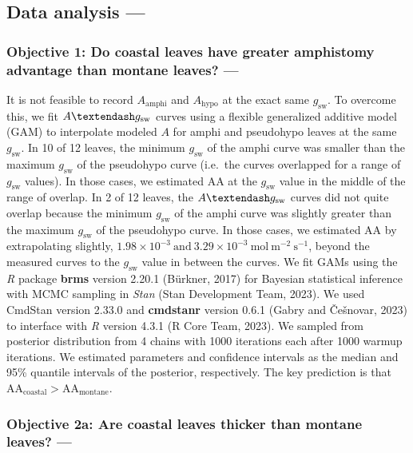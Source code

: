 \documentclass[
  letterpaper,
  DIV=11,
  numbers=noendperiod]{scrartcl}
\begin{document}
\hypertarget{data-analyis}{%
\subsection{Data analysis ---}\label{data-analyis}}

\hypertarget{objective-1-do-coastal-leaves-have-greater-amphistomy-advantage-than-montane-leaves}{%
\subsubsection{Objective 1: Do coastal leaves have greater amphistomy
advantage than montane leaves?
---}\label{objective-1-do-coastal-leaves-have-greater-amphistomy-advantage-than-montane-leaves}}

It is not feasible to record \(A_\mathrm{amphi}\) and
\(A_\mathrm{hypo}\) at the exact same \(g_\text{sw}\). To overcome this,
we fit \(A \textendash g_\text{sw}\) curves using a flexible generalized
additive model (GAM) to interpolate modeled \(A\) for amphi and
pseudohypo leaves at the same \(g_\text{sw}\). In 10 of 12 leaves, the
minimum \(g_\text{sw}\) of the amphi curve was smaller than the maximum
\(g_\text{sw}\) of the pseudohypo curve (i.e.~the curves overlapped for
a range of \(g_\text{sw}\) values). In those cases, we estimated
\(\mathrm{AA}\) at the \(g_\mathrm{sw}\) value in the middle of the
range of overlap. In 2 of 12 leaves, the \(A \textendash g_\text{sw}\)
curves did not quite overlap because the minimum \(g_\text{sw}\) of the
amphi curve was slightly greater than the maximum \(g_\text{sw}\) of the
pseudohypo curve. In those cases, we estimated \(\mathrm{AA}\) by
extrapolating slightly,
\(1.98\times 10^{-3}~\text{and}~3.29\times 10^{-3}~\text{mol}~\text{m}^{-2}~\text{s}^{-1}\),
beyond the measured curves to the \(g_\mathrm{sw}\) value in between the
curves. We fit GAMs using the \emph{R} package \textbf{brms} version
2.20.1 (Bürkner, 2017) for Bayesian statistical inference with MCMC
sampling in \emph{Stan} (Stan Development Team, 2023). We used CmdStan
version 2.33.0 and \textbf{cmdstanr} version 0.6.1 (Gabry and Češnovar,
2023) to interface with \emph{R} version 4.3.1 (R Core Team, 2023). We
sampled from posterior distribution from 4 chains with 1000 iterations
each after 1000 warmup iterations. We estimated parameters and
confidence intervals as the median and 95\% quantile intervals of the
posterior, respectively. The key prediction is that
\(\mathrm{AA}_\text{coastal} > \mathrm{AA}_\text{montane}\).

\hypertarget{objective-2a-are-coastal-leaves-thicker-than-montane-leaves}{%
\subsubsection{Objective 2a: Are coastal leaves thicker than montane
leaves?
---}\label{objective-2a-are-coastal-leaves-thicker-than-montane-leaves}}
\end{document}
